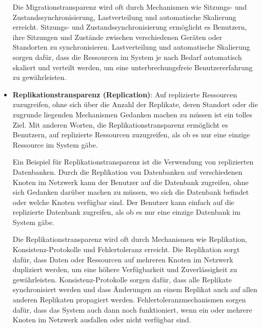 \documentclass[../vs-script-first-v01.tex]{subfiles}
\begin{document}
\begin{itemize}
Die Migrationstransparenz wird oft durch Mechanismen wie Sitzungs- und Zustandssynchronisierung, Lastverteilung und automatische Skalierung erreicht. Sitzungs- und Zustandssynchronisierung ermöglicht es Benutzern, ihre Sitzungen und Zustände zwischen verschiedenen Geräten oder Standorten zu synchronisieren. Lastverteilung und automatische Skalierung sorgen dafür, dass die Ressourcen im System je nach Bedarf automatisch skaliert und verteilt werden, um eine unterbrechungsfreie Benutzererfahrung zu gewährleisten.

\item \textbf{Replikationstransparenz (Replication)}:  Auf replizierte Ressourcen zuzugreifen, ohne sich über die Anzahl der Replikate, deren Standort oder die zugrunde liegenden Mechanismen Gedanken machen zu müssen ist ein tolles Ziel. Mit anderen Worten, die Replikationstransparenz ermöglicht es Benutzern, auf replizierte Ressourcen zuzugreifen, als ob es nur eine einzige Ressource im System gäbe.

Ein Beispiel für Replikationstransparenz ist die Verwendung von replizierten Datenbanken. Durch die Replikation von Datenbanken auf verschiedenen Knoten im Netzwerk kann der Benutzer auf die Datenbank zugreifen, ohne sich Gedanken darüber machen zu müssen, wo sich die Datenbank befindet oder welche Knoten verfügbar sind. Der Benutzer kann einfach auf die replizierte Datenbank zugreifen, als ob es nur eine einzige Datenbank im System gäbe.


Die Replikationstransparenz wird oft durch Mechanismen wie Replikation, Konsistenz-Protokolle und Fehlertoleranz erreicht. Die Replikation sorgt dafür, dass Daten oder Ressourcen auf mehreren Knoten im Netzwerk dupliziert werden, um eine höhere Verfügbarkeit und Zuverlässigkeit zu gewährleisten. Konsistenz-Protokolle sorgen dafür, dass alle Replikate synchronisiert werden und dass Änderungen an einem Replikat auch auf allen anderen Replikaten propagiert werden. Fehlertoleranzmechanismen sorgen dafür, dass das System auch dann noch funktioniert, wenn ein oder mehrere Knoten im Netzwerk ausfallen oder nicht verfügbar sind.


\end{itemize}
\end{document}

